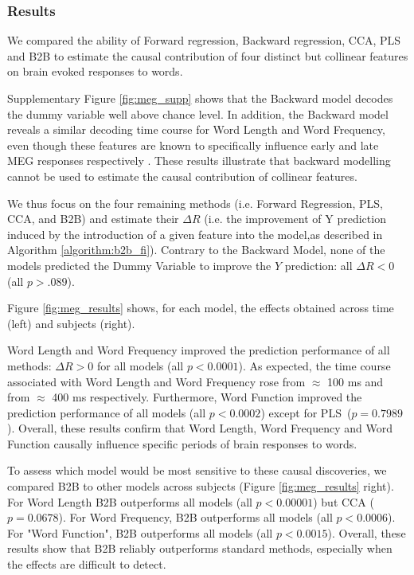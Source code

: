 \subsubsection{Results}
We compared the ability of Forward regression, Backward regression, CCA, PLS and B2B to estimate the causal contribution of four distinct but collinear features on brain evoked responses to words.

Supplementary Figure \ref{fig:meg_supp} shows that the Backward model decodes the dummy variable well above chance level. In addition, the Backward model reveals a similar decoding time course for Word Length and Word Frequency, even though these features are known to specifically influence early and late MEG responses respectively \citep{kutas2011thirty}. These results illustrate that backward modelling cannot be used to estimate the causal contribution of collinear features.

We thus focus on the four remaining methods (i.e. Forward Regression, PLS, CCA, and B2B) and estimate their $\Delta R$ (i.e. the improvement of Y prediction induced by the introduction of a given feature into the model,as described in Algorithm \ref{algorithm:b2b_fi}). Contrary to the Backward Model, none of the models predicted the Dummy Variable to improve the $Y$ prediction: all $\Delta R < 0$ (all $p > .089$).

Figure \ref{fig:meg_results} shows, for each model, the effects obtained across time (left) and subjects (right).

Word Length and Word Frequency improved the prediction performance of all methods: $\Delta R>0$ for all models (all $p<0.0001$). As expected, the time course associated with Word Length and Word Frequency rose from $\approx$ 100 ms and from $\approx$ 400 ms respectively. Furthermore, Word Function improved the prediction performance of all models (all $p < 0.0002$) except for PLS~($p=0.7989$). Overall, these results confirm that Word Length, Word Frequency and Word Function causally influence specific periods of brain responses to words.

To assess which model would be most sensitive to these causal discoveries, we compared B2B to other models across subjects (Figure \ref{fig:meg_results} right). For Word Length B2B outperforms all models (all $p < 0.00001$) but CCA ($p=0.0678$). For Word Frequency, B2B outperforms all models (all $p < 0.0006$). For "Word Function", B2B outperforms all models (all $p < 0.0015$). Overall, these results show that B2B reliably outperforms standard methods, especially when the effects are difficult to detect.

